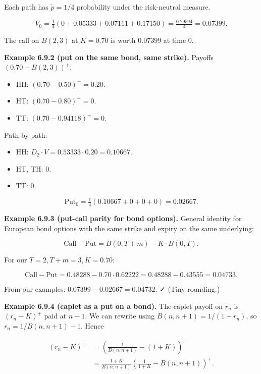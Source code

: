 \documentclass[
  10pt,
  twoside]{book}
\providecommand{\tightlist}{%
  \setlength{\itemsep}{0pt}\setlength{\parskip}{0pt}}
\begin{document}
Each path has \(\tilde p = 1/4\) probability under the risk-neutral
measure.

\[V_0 = \tfrac{1}{4}(0 + 0.05333 + 0.07111 + 0.17150) = \tfrac{0.29594}{4} = 0.07399.\]

The call on \(B(2, 3)\) at \(K = 0.70\) is worth \(0.07399\) at time 0.

\textbf{Example 6.9.2 (put on the same bond, same strike).} Payoffs
\((0.70 - B(2, 3))^+\):

\begin{itemize}
\tightlist
\item
  HH: \((0.70 - 0.50)^+ = 0.20\).
\item
  HT: \((0.70 - 0.80)^+ = 0\).
\item
  TT: \((0.70 - 0.94118)^+ = 0\).
\end{itemize}

Path-by-path:

\begin{itemize}
\tightlist
\item
  HH: \(D_2 \cdot V = 0.53333 \cdot 0.20 = 0.10667\).
\item
  HT, TH: \(0\).
\item
  TT: \(0\).
\end{itemize}

\[\text{Put}_0 = \tfrac{1}{4}(0.10667 + 0 + 0 + 0) = 0.02667.\]

\textbf{Example 6.9.3 (put-call parity for bond options).} General
identity for European bond options with the same strike and expiry on
the same underlying:

\[\text{Call} - \text{Put} = B(0, T+m) - K \cdot B(0, T).\]

For our \(T = 2, T+m = 3, K = 0.70\):

\[\text{Call} - \text{Put} = 0.48288 - 0.70 \cdot 0.62222 = 0.48288 - 0.43555 = 0.04733.\]

From our examples: \(0.07399 - 0.02667 = 0.04732\). ✓ (Tiny rounding.)

\textbf{Example 6.9.4 (caplet as a put on a bond).} The caplet payoff on
\(r_n\) is \((r_n - K)^+\) paid at \(n+1\). We can rewrite using
\(B(n, n+1) = 1/(1 + r_n)\), so \(r_n = 1/B(n, n+1) - 1\). Hence

\[\begin{aligned}
(r_n - K)^+ &= \left(\tfrac{1}{B(n, n+1)} - (1 + K)\right)^+ \\
&= \tfrac{1 + K}{B(n, n+1)}\left(\tfrac{1}{1 + K} - B(n, n+1)\right)^+.
\end{aligned}\]
\end{document}
